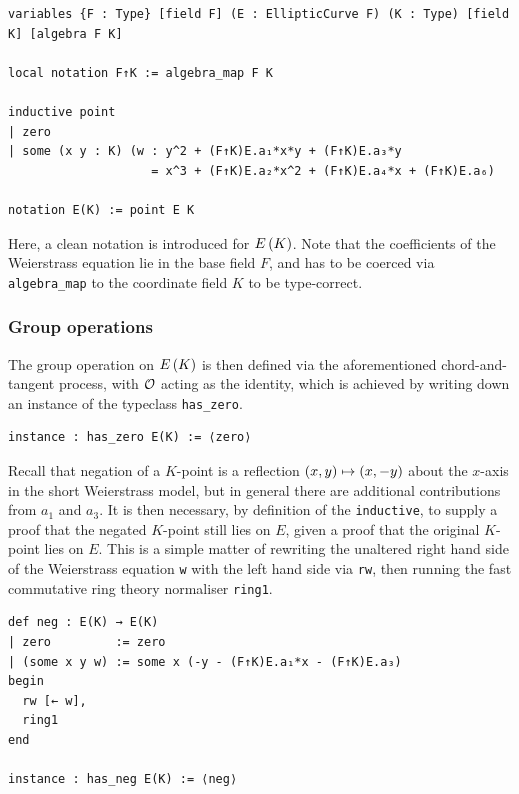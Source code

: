 \begin{lstlisting}[frame=single]
variables {F : Type} [field F] (E : EllipticCurve F) (K : Type) [field K] [algebra F K]

local notation F↑K := algebra_map F K

inductive point
| zero
| some (x y : K) (w : y^2 + (F↑K)E.a₁*x*y + (F↑K)E.a₃*y
                    = x^3 + (F↑K)E.a₂*x^2 + (F↑K)E.a₄*x + (F↑K)E.a₆)

notation E(K) := point E K
\end{lstlisting}

Here, a clean notation is introduced for $ E\br{K} $. Note that the coefficients of the Weierstrass equation lie in the base field $ F $, and has to be coerced via \texttt{algebra\_map} to the coordinate field $ K $ to be type-correct.

\subsubsection{Group operations}

The group operation on $ E\br{K} $ is then defined via the aforementioned chord-and-tangent process, with $ \mathcal{O} $ acting as the identity, which is achieved by writing down an instance of the typeclass \texttt{has\_zero}.

\begin{lstlisting}[frame=single]
instance : has_zero E(K) := ⟨zero⟩
\end{lstlisting}

Recall that negation of a $ K $-point is a reflection $ \br{x, y} \mapsto \br{x, -y} $ about the $ x $-axis in the short Weierstrass model, but in general there are additional contributions from $ a_1 $ and $ a_3 $. It is then necessary, by definition of the \texttt{inductive}, to supply a proof that the negated $ K $-point still lies on $ E $, given a proof that the original $ K $-point lies on $ E $. This is a simple matter of rewriting the unaltered right hand side of the Weierstrass equation \texttt{w} with the left hand side via \texttt{rw}, then running the fast commutative ring theory normaliser \texttt{ring1}.

\begin{lstlisting}[frame=single]
def neg : E(K) → E(K)
| zero         := zero
| (some x y w) := some x (-y - (F↑K)E.a₁*x - (F↑K)E.a₃)
begin
  rw [← w],
  ring1
end

instance : has_neg E(K) := ⟨neg⟩
\end{lstlisting}

